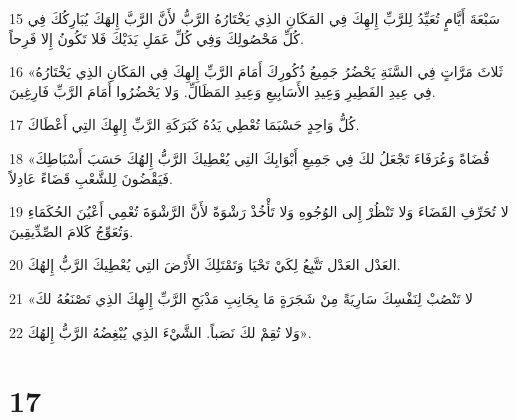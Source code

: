 \par 15 سَبْعَةَ أَيَّامٍ تُعَيِّدُ لِلرَّبِّ إِلهِكَ فِي المَكَانِ الذِي يَخْتَارُهُ الرَّبُّ لأَنَّ الرَّبَّ إِلهَكَ يُبَارِكُكَ فِي كُلِّ مَحْصُولِكَ وَفِي كُلِّ عَمَلِ يَدَيْكَ فَلا تَكُونُ إِلا فَرِحاً.
\par 16 «ثَلاثَ مَرَّاتٍ فِي السَّنَةِ يَحْضُرُ جَمِيعُ ذُكُورِكَ أَمَامَ الرَّبِّ إِلهِكَ فِي المَكَانِ الذِي يَخْتَارُهُ فِي عِيدِ الفَطِيرِ وَعِيدِ الأَسَابِيعِ وَعِيدِ المَظَالِّ. وَلا يَحْضُرُوا أَمَامَ الرَّبِّ فَارِغِينَ.
\par 17 كُلُّ وَاحِدٍ حَسْبَمَا تُعْطِي يَدُهُ كَبَرَكَةِ الرَّبِّ إِلهِكَ التِي أَعْطَاكَ.
\par 18 «قُضَاةً وَعُرَفَاءَ تَجْعَلُ لكَ فِي جَمِيعِ أَبْوَابِكَ التِي يُعْطِيكَ الرَّبُّ إِلهُكَ حَسَبَ أَسْبَاطِكَ فَيَقْضُونَ لِلشَّعْبِ قَضَاءً عَادِلاً.
\par 19 لا تُحَرِّفِ القَضَاءَ وَلا تَنْظُرْ إِلى الوُجُوهِ وَلا تَأْخُذْ رَشْوَةً لأَنَّ الرَّشْوَةَ تُعْمِي أَعْيُنَ الحُكَمَاءِ وَتُعَوِّجُ كَلامَ الصِّدِّيقِينَ.
\par 20 العَدْل العَدْل تَتَّبِعُ لِكَيْ تَحْيَا وَتَمْتَلِكَ الأَرْضَ التِي يُعْطِيكَ الرَّبُّ إِلهُكَ.
\par 21 «لا تَنْصُبْ لِنَفْسِكَ سَارِيَةً مِنْ شَجَرَةٍ مَا بِجَانِبِ مَذْبَحِ الرَّبِّ إِلهِكَ الذِي تَصْنَعُهُ لكَ
\par 22 وَلا تُقِمْ لكَ نَصَباً. الشَّيْءَ الذِي يُبْغِضُهُ الرَّبُّ إِلهُكَ».

\chapter{17}

